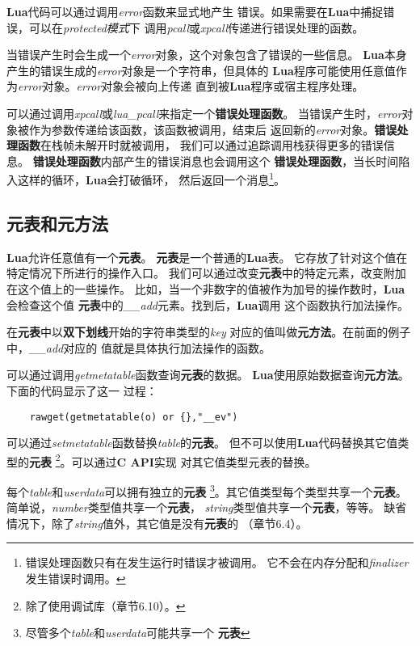 \documentclass{ctexart}
\begin{document}
\textbf{Lua}代码可以通过调用\emph{error}函数来显式地产生
错误。如果需要在\textbf{Lua}中捕捉错误，可以在\emph{protected模式}下
调用\emph{pcall}或\emph{xpcall}传递进行错误处理的函数。

当错误产生时会生成一个\emph{error}对象，这个对象包含了错误的一些信息。
\textbf{Lua}本身产生的错误生成的\emph{error}对象是一个字符串，但具体的
\textbf{Lua}程序可能使用任意值作为\emph{error}对象。\emph{error}对象会被向上传递
直到被\textbf{Lua}程序或宿主程序处理。

可以通过调用\emph{xpcall}或\emph{lua\_pcall}来指定一个\textbf{错误处理函数}。
当错误产生时，\emph{error}对象被作为参数传递给该函数，该函数被调用，结束后
返回新的\emph{error}对象。\textbf{错误处理函数}在栈帧未解开时就被调用，
我们可以通过追踪调用栈获得更多的错误信息。
\textbf{错误处理函数}内部产生的错误消息也会调用这个
\textbf{错误处理函数}，当长时间陷入这样的循环，\textbf{Lua}会打破循环，
然后返回一个消息\footnote{错误处理函数只有在发生运行时错误才被调用。
它不会在内存分配和\emph{finalizer}发生错误时调用。}。

\subsection{元表和元方法}

\textbf{Lua}允许任意值有一个\textbf{元表}。
\textbf{元表}是一个普通的\textbf{Lua}表。
它存放了针对这个值在特定情况下所进行的操作入口。
我们可以通过改变\textbf{元表}中的特定元素，改变附加在这个值上的一些操作。
比如，当一个非数字的值被作为加号的操作数时，\textbf{Lua}会检查这个值
\textbf{元表}中的\emph{\_\_add}元素。找到后，\textbf{Lua}调用
这个函数执行加法操作。

在\textbf{元表}中以\textbf{双下划线}开始的字符串类型的\emph{key}
对应的值叫做\textbf{元方法}。在前面的例子中，\emph{\_\_add}对应的
值就是具体执行加法操作的函数。

可以通过调用\emph{getmetatable}函数查询\textbf{元表}的数据。
\textbf{Lua}使用原始数据查询\textbf{元方法}。下面的代码显示了这一
过程：

\lstset{language=C}
\begin{lstlisting}
	rawget(getmetatable(o) or {},"__ev")
\end{lstlisting}

可以通过\emph{setmetatable}函数替换\emph{table}的\textbf{元表}。
但不可以使用\textbf{Lua}代码替换其它值类型的\textbf{元表}
\footnote{除了使用调试库（章节6.10）。}。可以通过\textbf{C API}实现
对其它值类型元表的替换。

每个\emph{table}和\emph{userdata}可以拥有独立的\textbf{元表}
\footnote{尽管多个\emph{table}和\emph{userdata}可能共享一个
\textbf{元表}}。其它值类型每个类型共享一个\textbf{元表}。
简单说，\emph{number}类型值共享一个\textbf{元表}，
\emph{string}类型值共享一个\textbf{元表}，等等。
缺省情况下，除了\emph{string}值外，其它值是没有\textbf{元表}的
（章节6.4）。
\end{document}
